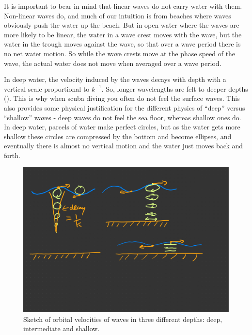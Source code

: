 It is important to bear in mind that linear waves do not carry water with them.  Non-linear waves do, and much of our intuition is from beaches where waves obviously push the water up the beach.  But in open water where the waves are more likely to be linear, the water in a wave crest moves with the wave, but the water in the trough moves against the wave, so that over a wave period there is no net water motion. So while the wave crests move at the phase speed of the wave, the actual water does not move when averaged over a wave period. 

In deep water, the velocity induced by the waves decays with depth with a vertical scale proportional to $k^{-1}$.  So, longer wavelengths are felt to deeper depths ().  This is why when scuba diving you often do not feel the surface waves.    This also provides some physical justification for the different physics of ``deep'' versus ``shallow'' waves - deep waves do not feel the sea floor, whereas shallow ones do.  In deep water, parcels of water make perfect circles, but as the water gets more shallow these circles are compressed by the bottom and become ellipses, and eventually there is almost no vertical motion and the water just moves back and forth.  

\begin{figure}[hbt]
  \begin{center}
    \includegraphics{figs/Waves/SketchOrbitalVel}
    \caption{Sketch of orbital velocities of waves in three different depths: deep, intermediate and shallow.}
    \label{fig:SketchOrbitalVel}  
  \end{center}
\end{figure}

